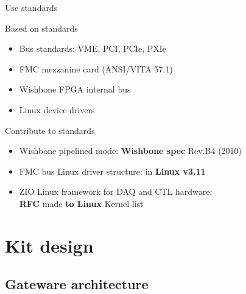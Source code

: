 \documentclass[compress,red]{beamer}
\begin{document}
\begin{frame}{Use standards}

  \begin{block}{Based on standards}
    \begin{itemize}
    \item Bus standards: VME, PCI, PCIe, PXIe
    \item FMC mezzanine card (ANSI/VITA 57.1)
    \item Wishbone FPGA internal bus
    \item Linux device drivers
    \end{itemize}
  \end{block}

  \begin{block}{Contribute to standards}
    \begin{itemize}
    \item Wishbone pipelined mode: \textbf{Wishbone spec} Rev.B4 (2010)
    \item FMC bus Linux driver structure: in \textbf{Linux v3.11}
    \item ZIO Linux framework for DAQ and CTL hardware: \\ \textbf{RFC} made \textbf{to Linux} Kernel list
    \end{itemize}
  \end{block}

\end{frame}


\section{Kit design}



\subsection{Gateware architecture}
\end{document}
